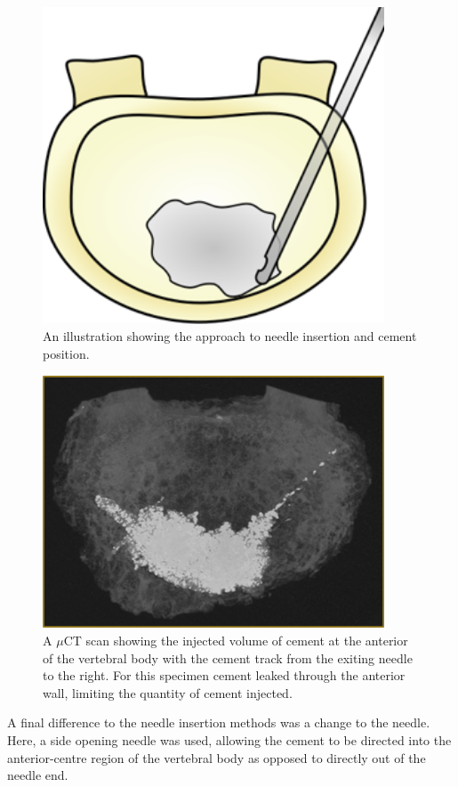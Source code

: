 \begin{figure}[h!]
  \centering
  \includegraphics[width=4in]{Chapters/Chapter_HT_images/vp_illustration.png}
  \caption{An illustration showing the approach to needle insertion and cement
position.}
  \label{fig:vp-ill}
\end{figure}


\begin{figure}[h!]
  \centering
 
\includegraphics[width=4in]{Chapters/Chapter_HT_images/vp_illustration_scan.png}
  \caption{A $\mu$CT scan showing the injected volume of cement at the anterior
of the vertebral body with the cement track from the exiting needle to the
right. For this specimen cement leaked through the anterior wall, limiting the
quantity of cement injected.}
  \label{fig:vp-ill_scan}
\end{figure}

A final difference to the needle insertion methods was a change to the needle.
Here, a side opening needle was used, allowing the cement to be directed into
the anterior-centre region of the vertebral body as opposed to directly out of
the needle end.

